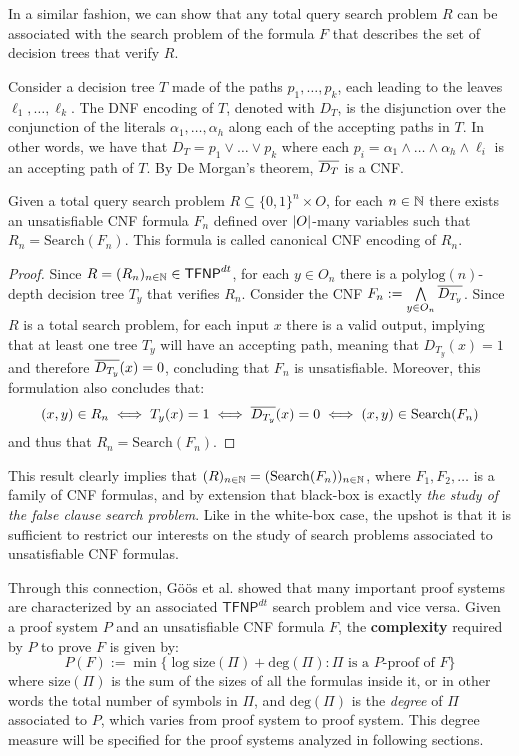     In a similar fashion, we can show that any total query search problem $R$ can be associated with the search problem of the formula $F$ that describes the set of decision trees that verify $R$.

Consider a decision tree $T$ made of the paths $p_1, \ldots, p_k$, each leading to the leaves $\ell_1, \ldots, \ell_k$. The DNF encoding of $T$, denoted with $D_T$, is the disjunction over the conjunction of the literals $\alpha_1, \ldots, \alpha_h$ along each of the accepting paths in $T$. In other words, we have that $D_T = p_1 \lor \ldots \lor p_k$ where each $p_i = \alpha_1 \land \ldots \land \alpha_h \land \ell_i$ is an accepting path of $T$. By De Morgan's theorem, $\overline{D_T}$ is a CNF.

\begin{proposition}
    \label{Rdt = Search(F)}
    Given a total query search problem $R \subseteq \{0,1\}^n \times O$, for each $n \in \mathbb{N}$ there exists an unsatisfiable CNF formula $F_n$ defined over $\left|O\right|$-many variables such that $R_n = \mathrm{Search}(F_n)$. This formula is called canonical CNF encoding of $R_n$.
\end{proposition}

\begin{proof}
    Since $R = (R_n)_{n \in \mathbb{N}} \in \textsf{TFNP}^{dt}$, for each $y \in O_n$ there is a $\mathrm{polylog}(n)$-depth decision tree $T_y$ that verifies $R_n$. Consider the CNF $F_n := \bigwedge\limits_{y \in O_n} \overline{D_{T_y}}$. Since $R$ is a total search problem, for each input $x$ there is a valid output, implying that at least one tree $T_y$ will have an accepting path, meaning that $D_{T_y}(x) = 1$ and therefore $\overline{D_{T_y}}(x) = 0$, concluding that $F_n$ is unsatisfiable. Moreover, this formulation also concludes that:
    \[(x,y) \in R_n \iff T_y(x) = 1 \iff \overline{D_{T_y}}(x) = 0 \iff (x,y) \in \mathrm{Search}(F_n)\]
    and thus that $R_n = \mathrm{Search}(F_n)$.

\end{proof}

This result clearly implies that $(R)_{n \in \mathbb{N}} = (\mathrm{Search}(F_n))_{n \in \mathbb{N}}$, where $F_1, F_2, \ldots$ is a family of CNF formulas, and by extension that black-box \TFNP is exactly \textit{the study of the false clause search problem}. Like in the white-box case, the upshot is that it is sufficient to restrict our interests on the study of search problems associated to unsatisfiable CNF formulas.

Through this connection, Göös et al. \cite{adventures_monotone_tfnp} showed that many important proof systems are characterized by an associated $\mathsf{TFNP}^{dt}$ search problem and vice versa. Given a proof system $P$ and an unsatisfiable CNF formula $F$, the \textbf{complexity} required by $P$ to prove $F$ is given by:
\[P(F) := \min\{\log \mathrm{size}(\Pi) + \mathrm{deg}(\Pi) : \Pi \text{ is a $P$-proof of } F\}\]
where $\mathrm{size}(\Pi)$ is the sum of the sizes of all the formulas inside it, or in other words the total number of symbols in $\Pi$, and $\mathrm{deg}(\Pi)$ is the \textit{degree} of $\Pi$ associated to $P$, which varies from proof system to proof system. This degree measure will be specified for the proof systems analyzed in following sections.

